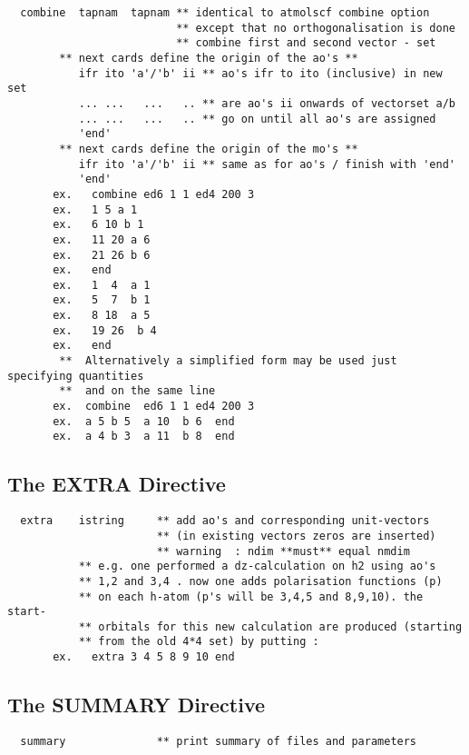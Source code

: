\documentclass[11pt,fleqn]{article}
\begin{document}
{
\footnotesize
\begin{verbatim} 
  combine  tapnam  tapnam ** identical to atmolscf combine option
                          ** except that no orthogonalisation is done
                          ** combine first and second vector - set
        ** next cards define the origin of the ao's **
           ifr ito 'a'/'b' ii ** ao's ifr to ito (inclusive) in new set
           ... ...   ...   .. ** are ao's ii onwards of vectorset a/b
           ... ...   ...   .. ** go on until all ao's are assigned
           'end'
        ** next cards define the origin of the mo's **
           ifr ito 'a'/'b' ii ** same as for ao's / finish with 'end'
           'end'
       ex.   combine ed6 1 1 ed4 200 3
       ex.   1 5 a 1
       ex.   6 10 b 1
       ex.   11 20 a 6
       ex.   21 26 b 6
       ex.   end
       ex.   1  4  a 1
       ex.   5  7  b 1
       ex.   8 18  a 5
       ex.   19 26  b 4
       ex.   end
        **  Alternatively a simplified form may be used just specifying quantities
        **  and on the same line
       ex.  combine  ed6 1 1 ed4 200 3
       ex.  a 5 b 5  a 10  b 6  end
       ex.  a 4 b 3  a 11  b 8  end
\end{verbatim}
}

\subsection{The EXTRA Directive}

{
\footnotesize
\begin{verbatim} 
  extra    istring     ** add ao's and corresponding unit-vectors
                       ** (in existing vectors zeros are inserted)
                       ** warning  : ndim **must** equal nmdim
           ** e.g. one performed a dz-calculation on h2 using ao's
           ** 1,2 and 3,4 . now one adds polarisation functions (p)
           ** on each h-atom (p's will be 3,4,5 and 8,9,10). the start-
           ** orbitals for this new calculation are produced (starting
           ** from the old 4*4 set) by putting :
       ex.   extra 3 4 5 8 9 10 end
\end{verbatim}
}

\subsection{The SUMMARY Directive}

{
\footnotesize
\begin{verbatim} 
  summary              ** print summary of files and parameters
\end{verbatim}
}
\end{document}
